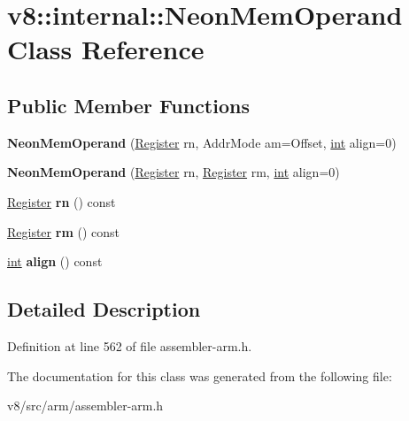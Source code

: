 \hypertarget{classv8_1_1internal_1_1NeonMemOperand}{}\section{v8\+:\+:internal\+:\+:Neon\+Mem\+Operand Class Reference}
\label{classv8_1_1internal_1_1NeonMemOperand}
\subsection*{Public Member Functions}
\begin{DoxyCompactItemize}
\item 
\mbox{\label{classv8_1_1internal_1_1NeonMemOperand_ac4387d23a921ac273b25d9c8732e7687}} 
{\bfseries Neon\+Mem\+Operand} (\mbox{\hyperlink{classv8_1_1internal_1_1Register}{Register}} rn, Addr\+Mode am=Offset, \mbox{\hyperlink{classint}{int}} align=0)
\item 
\mbox{\label{classv8_1_1internal_1_1NeonMemOperand_abbef13badc89dacc56175c67d937ec71}} 
{\bfseries Neon\+Mem\+Operand} (\mbox{\hyperlink{classv8_1_1internal_1_1Register}{Register}} rn, \mbox{\hyperlink{classv8_1_1internal_1_1Register}{Register}} rm, \mbox{\hyperlink{classint}{int}} align=0)
\item 
\mbox{\label{classv8_1_1internal_1_1NeonMemOperand_a7e7c4d207152a860917533dc7c1df5cf}} 
\mbox{\hyperlink{classv8_1_1internal_1_1Register}{Register}} {\bfseries rn} () const
\item 
\mbox{\label{classv8_1_1internal_1_1NeonMemOperand_ab3077ca2c8a681120c19ad13bc2486fc}} 
\mbox{\hyperlink{classv8_1_1internal_1_1Register}{Register}} {\bfseries rm} () const
\item 
\mbox{\label{classv8_1_1internal_1_1NeonMemOperand_acd589f9fef759243386597d11c11aa91}} 
\mbox{\hyperlink{classint}{int}} {\bfseries align} () const
\end{DoxyCompactItemize}


\subsection{Detailed Description}


Definition at line 562 of file assembler-\/arm.\+h.



The documentation for this class was generated from the following file\+:\begin{DoxyCompactItemize}
\item 
v8/src/arm/assembler-\/arm.\+h\end{DoxyCompactItemize}
